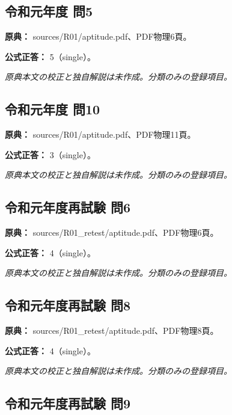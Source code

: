 \subsection{令和元年度 問5}
\label{q:r01-reg-apt-05}

\noindent\textbf{原典：} sources/R01/aptitude.pdf、PDF物理6頁。

\textbf{公式正答：} 5（single）。

\par\textit{原典本文の校正と独自解説は未作成。分類のみの登録項目。}

\subsection{令和元年度 問10}
\label{q:r01-reg-apt-10}

\noindent\textbf{原典：} sources/R01/aptitude.pdf、PDF物理11頁。

\textbf{公式正答：} 3（single）。

\par\textit{原典本文の校正と独自解説は未作成。分類のみの登録項目。}

\subsection{令和元年度再試験 問6}
\label{q:r01-ret-apt-06}

\noindent\textbf{原典：} sources/R01\_retest/aptitude.pdf、PDF物理6頁。

\textbf{公式正答：} 4（single）。

\par\textit{原典本文の校正と独自解説は未作成。分類のみの登録項目。}

\subsection{令和元年度再試験 問8}
\label{q:r01-ret-apt-08}

\noindent\textbf{原典：} sources/R01\_retest/aptitude.pdf、PDF物理8頁。

\textbf{公式正答：} 4（single）。

\par\textit{原典本文の校正と独自解説は未作成。分類のみの登録項目。}

\subsection{令和元年度再試験 問9}
\label{q:r01-ret-apt-09}

